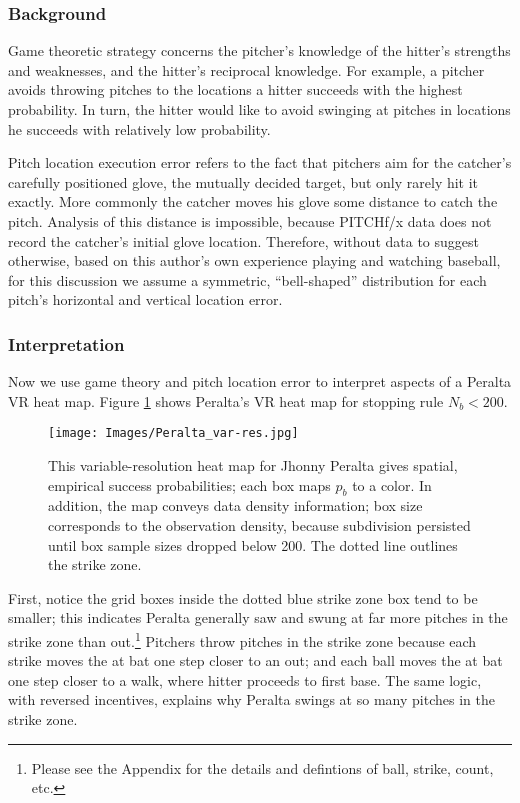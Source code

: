 \subsubsection*{Background}

Game theoretic strategy concerns the pitcher's knowledge of the hitter's strengths and weaknesses, and the hitter's reciprocal knowledge. For example, a pitcher avoids throwing pitches to the locations a hitter succeeds with the highest probability. In turn, the hitter would like to avoid swinging at pitches in locations he succeeds with relatively low probability.

Pitch location execution error refers to the fact that pitchers aim for the catcher's carefully positioned glove, the mutually decided target, but only rarely hit it exactly. More commonly the catcher moves his glove some distance to catch the pitch.  Analysis of this distance is impossible, because PITCHf/x\textsuperscript{\textregistered} data does not record the catcher's initial glove location. Therefore, without data to suggest otherwise, based on this author's own experience playing and watching baseball, for this discussion we assume a symmetric, ``bell-shaped'' distribution for each pitch's horizontal and vertical location error.

\subsubsection*{Interpretation}
Now we use game theory and pitch location error to interpret aspects of a Peralta VR heat map. Figure \ref{fig:interp} shows Peralta's VR heat map for stopping rule $N_{b} < 200$.
        \begin{figure}[H]
      	\centering      
      	\texttt{[image: Images/Peralta\_var-res.jpg]}
      	\caption{This variable-resolution heat map for Jhonny Peralta gives spatial, empirical success probabilities; each box maps $p_{b}$ to a color. In addition, the map conveys data density information; box size corresponds to the observation density, because subdivision persisted until box sample sizes dropped below 200. The dotted line outlines the strike zone.}
      	\label{fig:interp}
        \end{figure}
First, notice the grid boxes inside the dotted blue strike zone box tend to be smaller; this indicates Peralta generally saw and swung at far more pitches in the strike zone than out.\footnote{Please see the Appendix for the details and defintions of ball, strike, count, etc.} Pitchers throw pitches in the strike zone because each strike moves the at bat one step closer to an out; and each ball moves the at bat one step closer to a walk, where hitter proceeds to first base. The same logic, with reversed incentives, explains why Peralta swings at so many pitches in the strike zone. 

